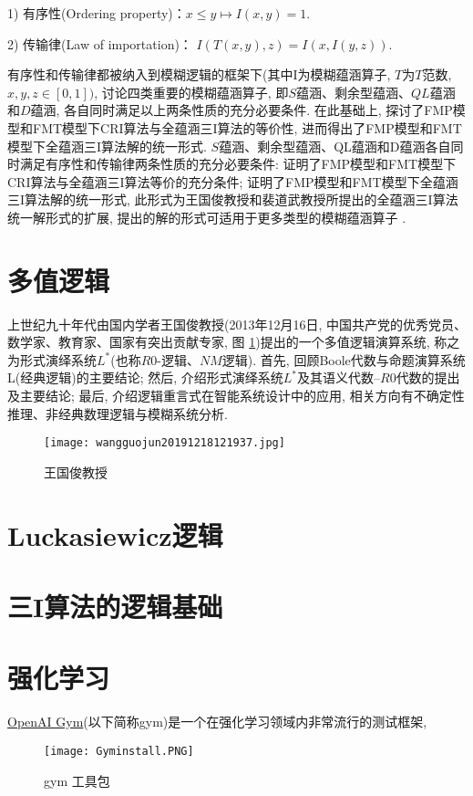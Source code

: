 1) 有序性(Ordering property)：$ x\leq y\longmapsto I(x,y)=1$.

2) 传输律(Law of importation)： $I(T(x,y),z)=I(x,I(y,z))$.

有序性和传输律都被纳入到模糊逻辑的框架下(其中I为模糊蕴涵算子, $T$为$T$范数, $x,y,z\in [0,1])$, 讨论四类重要的模糊蕴涵算子, 即$S$蕴涵、剩余型蕴涵、$QL$蕴涵和$D$蕴涵, 各自同时满足以上两条性质的充分必要条件.
在此基础上, 探讨了FMP模型和FMT模型下CRI算法与全蕴涵三I算法的等价性, 进而得出了FMP模型和FMT模型下全蕴涵三I算法解的统一形式.
$S$蕴涵、剩余型蕴涵、QL蕴涵和D蕴涵各自同时满足有序性和传输律两条性质的充分必要条件: 证明了FMP模型和FMT模型下CRI算法与全蕴涵三I算法等价的充分条件;
证明了FMP模型和FMT模型下全蕴涵三I算法解的统一形式, 此形式为王国俊教授和裴道武教授所提出的全蕴涵三I算法统一解形式的扩展, 提出的解的形式可适用于更多类型的模糊蕴涵算子 .
\section{多值逻辑}
上世纪九十年代由国内学者王国俊教授(2013年12月16日, 中国共产党的优秀党员、数学家、教育家、国家有突出贡献专家, 图 \ref{wangguojun20191218121937})提出的一个多值逻辑演算系统, 称之为形式演绎系统$L^*$(也称$R0$-逻辑、$NM$逻辑). 首先, 回顾Boole代数与命题演算系统L(经典逻辑)的主要结论; 然后, 介绍形式演绎系统$L^*$及其语义代数--$R0$代数的提出及主要结论; 最后, 介绍逻辑重言式在智能系统设计中的应用, 相关方向有不确定性推理、非经典数理逻辑与模糊系统分析.
\begin{figure}[H]
\centering
\texttt{[image: wangguojun20191218121937.jpg]}
\caption{王国俊教授}
\label{wangguojun20191218121937}
\end{figure}
\section{Luckasiewicz逻辑}
\section{三I算法的逻辑基础}
\section{强化学习}
\href{https://gym.openai.com/}{OpenAI Gym}(以下简称gym)是一个在强化学习领域内非常流行的测试框架,
\begin{figure}[H]
\centering
\texttt{[image: Gyminstall.PNG]}
\caption{gym 工具包}
\label{Gyminstall}
\end{figure}

